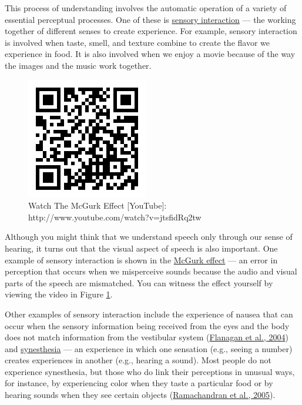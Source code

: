 \documentclass[
]{krantz}
\begin{document}
This process of understanding involves the automatic operation of a variety of essential perceptual processes. One of these is \protect\hyperlink{sensory-interaction}{sensory interaction} --- the working together of different senses to create experience. For example, sensory interaction is involved when taste, smell, and texture combine to create the flavor we experience in food. It is also involved when we enjoy a movie because of the way the images and the music work together.

\begin{figure}

{\centering \includegraphics[width=0.25\linewidth]{images/ch2/qr} 

}

\caption{Watch The McGurk Effect [YouTube]: http://www.youtube.com/watch?v=jtsfidRq2tw }\label{fig:mcgurk}
\end{figure}

Although you might think that we understand speech only through our sense of hearing, it turns out that the visual aspect of speech is also important. One example of sensory interaction is shown in the \protect\hyperlink{mcgurk-effect}{McGurk effect} --- an error in perception that occurs when we misperceive sounds because the audio and visual parts of the speech are mismatched. You can witness the effect yourself by viewing the video in Figure \ref{fig:mcgurk}.

Other examples of sensory interaction include the experience of nausea that can occur when the sensory information being received from the eyes and the body does not match information from the vestibular system (\protect\hyperlink{ref-Flanagan2004}{Flanagan et al., 2004}) and \protect\hyperlink{synesthesia}{synesthesia} --- an experience in which one sensation (e.g., seeing a number) creates experiences in another (e.g., hearing a sound). Most people do not experience synesthesia, but those who do link their perceptions in unusual ways, for instance, by experiencing color when they taste a particular food or by hearing sounds when they see certain objects (\protect\hyperlink{ref-Ramachandran2005}{Ramachandran et al., 2005}).
\end{document}
